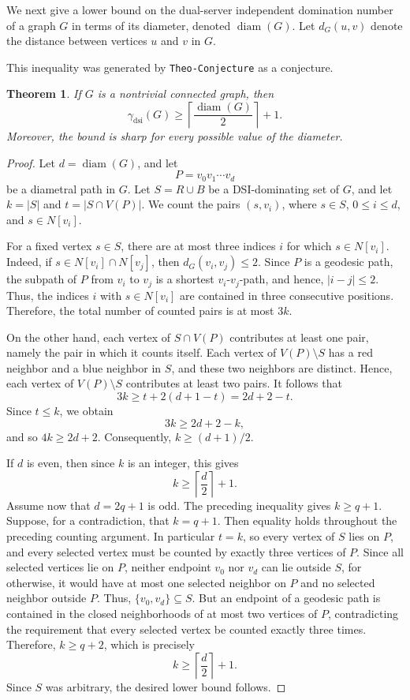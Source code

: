 \documentclass[11pt]{article}
\newtheorem{theorem}{Theorem}
\theoremstyle{definition}
\theoremstyle{remark}
\newcommand{\dsi}{\mathrm{dsi}}
\newcommand{\diam}{\operatorname{diam}}
\DeclareRobustCommand{\TheoConjecture}{\texttt{Theo-Conjecture}}
\begin{document}
We next give a lower bound on the dual-server independent domination number of a graph $G$ in terms of its diameter, denoted \(\diam(G)\).  Let \(d_G(u,v)\) denote the distance between vertices $u$ and $v$ in $G$.

This inequality was generated by \TheoConjecture{} as a conjecture.

\begin{theorem}
\label{thm:diameter}
If \(G\) is a nontrivial connected graph, then
\[
   \gamma_{\dsi}(G)\ge \left\lceil \frac{\diam(G)}{2}\right\rceil+1.
\]
Moreover, the bound is sharp for every possible value of the diameter.
\end{theorem}

\begin{proof}
Let \(d=\diam(G)\), and let
\[
   P=v_0v_1\cdots v_d
\]
be a diametral path in \(G\). Let \(S=R\cup B\) be a DSI-dominating set of
\(G\), and let \(k=|S|\) and \(t=|S\cap V(P)|\). We count the pairs
\((s,v_i)\), where \(s\in S\), \(0\le i\le d\), and \(s\in N[v_i]\).

For a fixed vertex \(s\in S\), there are at most three indices \(i\) for
which \(s\in N[v_i]\). Indeed, if \(s\in N[v_i]\cap N[v_j]\), then
\(d_G(v_i,v_j)\le 2\). Since \(P\) is a geodesic path, the subpath of \(P\)
from \(v_i\) to \(v_j\) is  a shortest $v_i$-$v_j$-path, and hence, \(|i-j|\le 2\). Thus, the
indices \(i\) with \(s\in N[v_i]\) are contained in three consecutive
positions. Therefore, the total number of counted pairs is at most \(3k\).

On the other hand, each vertex of \(S\cap V(P)\) contributes at least one
pair, namely the pair in which it counts itself. Each vertex of
\(V(P)\setminus S\) has a red neighbor and a blue neighbor in \(S\), and
these two neighbors are distinct. Hence, each vertex of \(V(P)\setminus S\)
contributes at least two pairs. It follows that
\[
   3k\ge t+2(d+1-t)=2d+2-t.
\]
Since \(t\le k\), we obtain
\[
   3k\ge 2d+2-k,
\]
and so \(4k\ge 2d+2\). Consequently, \(k\ge (d+1)/2\).

If \(d\) is even, then since \(k\) is an integer, this  gives
\[
   k\ge \left\lceil \frac d2\right\rceil+1.
\]
Assume now that \(d=2q+1\) is odd. The preceding inequality gives
\(k\ge q+1\). Suppose, for a contradiction, that \(k=q+1\). Then equality
holds throughout the preceding counting argument. In particular \(t=k\), so
every vertex of \(S\) lies on \(P\), and every selected vertex must be counted
by exactly three vertices of \(P\). Since all selected vertices lie on \(P\),
neither endpoint \(v_0\) nor \(v_d\) can lie outside \(S\), for otherwise, it would have at most one selected neighbor on \(P\) and no selected
neighbor outside \(P\). Thus, \(\{v_0,v_d\} \subseteq S\). But an endpoint of a geodesic
path is contained in the closed neighborhoods of at most two vertices of
\(P\), contradicting the requirement that every selected vertex be counted
exactly three times. Therefore, \(k\ge q+2\), which is precisely
\[
   k\ge \left\lceil \frac d2\right\rceil+1.
\]
Since \(S\) was arbitrary, the desired lower bound follows.


\end{proof}
\end{document}
